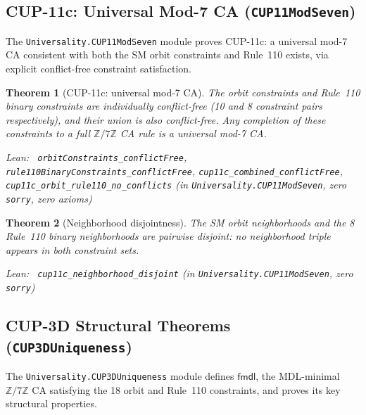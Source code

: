 \documentclass[11pt,a4paper]{article}
\newenvironment{leanref}%
  {\par\smallskip\noindent\begingroup\raggedright\textup{Lean:}~}%
  {\par\endgroup}
\newtheorem{theorem}{Theorem}[section]
\theoremstyle{definition}
\begin{document}
\subsection{CUP-11c: Universal Mod-7 CA (\texttt{CUP11ModSeven})}\label{subsec:cup11-mod-seven}

The \texttt{Universality.CUP11ModSeven} module proves CUP-11c: a universal mod-7 CA
consistent with both the SM orbit constraints and Rule~110 exists, via explicit
conflict-free constraint satisfaction.

\begin{theorem}[CUP-11c: universal mod-7 CA]\label{thm:cup11c}
The orbit constraints and Rule~110 binary constraints are individually conflict-free
(10 and 8 constraint pairs respectively), and their union is also conflict-free.
Any completion of these constraints to a full $\mathbb{Z}/7\mathbb{Z}$ CA rule is
a universal mod-7 CA.

\begin{leanref}
\lstinline|orbitConstraints_conflictFree|,
\lstinline|rule110BinaryConstraints_conflictFree|,
\lstinline|cup11c_combined_conflictFree|,
\lstinline|cup11c_orbit_rule110_no_conflicts|
\textup{(in \texttt{Universality.CUP11ModSeven}, zero \texttt{sorry}, zero axioms)}
\end{leanref}
\end{theorem}

\begin{theorem}[Neighborhood disjointness]\label{thm:cup11c-disjoint}
The SM orbit neighborhoods and the 8 Rule~110 binary neighborhoods are pairwise
disjoint: no neighborhood triple appears in both constraint sets.

\begin{leanref}
\lstinline|cup11c_neighborhood_disjoint|
\textup{(in \texttt{Universality.CUP11ModSeven}, zero \texttt{sorry})}
\end{leanref}
\end{theorem}

\subsection{CUP-3D Structural Theorems (\texttt{CUP3DUniqueness})}\label{subsec:cup3d-uniqueness}

The \texttt{Universality.CUP3DUniqueness} module defines $\mathsf{fmdl}$, the MDL-minimal
$\mathbb{Z}/7\mathbb{Z}$ CA satisfying the 18 orbit and Rule~110 constraints, and
proves its key structural properties.
\end{document}
